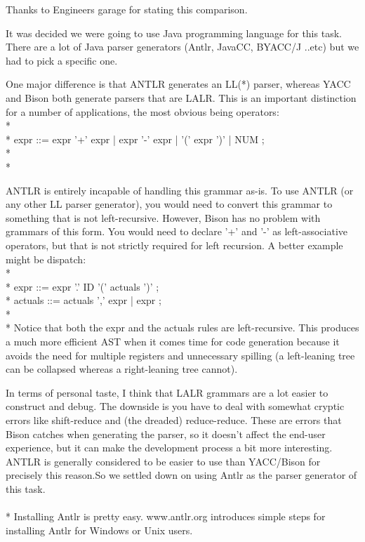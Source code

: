 \documentclass[a4paper]{article}
\begin{document}
Thanks to Engineers garage for stating this comparison.

\newpage
\bigskip
  \bigskip

It was decided we were going to use Java programming language for this task. There are a lot of Java parser generators (Antlr, JavaCC, BYACC/J ..etc) but we had to pick a specific one.

One major difference is that ANTLR generates an LL(*) parser, whereas YACC and Bison both generate parsers that are LALR. This is an important distinction for a number of applications, the most obvious being operators:
\\*
\\*
expr ::= expr '+' expr
       | expr '-' expr
       | '(' expr ')'
       | NUM ;
       \\*
\\*


ANTLR is entirely incapable of handling this grammar as-is. To use ANTLR (or any other LL parser generator), you would need to convert this grammar to something that is not left-recursive. However, Bison has no problem with grammars of this form. You would need to declare '+' and '-' as left-associative operators, but that is not strictly required for left recursion. A better example might be dispatch:
\\*
\\*
expr ::= expr '.' ID '(' actuals ')' ;
\\*
actuals ::= actuals ',' expr | expr ;
\\*
\\*
Notice that both the expr and the actuals rules are left-recursive. This produces a much more efficient AST when it comes time for code generation because it avoids the need for multiple registers and unnecessary spilling (a left-leaning tree can be collapsed whereas a right-leaning tree cannot).

In terms of personal taste, I think that LALR grammars are a lot easier to construct and debug. The downside is you have to deal with somewhat cryptic errors like shift-reduce and (the dreaded) reduce-reduce. These are errors that Bison catches when generating the parser, so it doesn't affect the end-user experience, but it can make the development process a bit more interesting. ANTLR is generally considered to be easier to use than YACC/Bison for precisely this reason.So we settled down on using Antlr as the parser generator of this task. \\
\\*
Installing Antlr is pretty easy. www.antlr.org introduces simple steps for installing Antlr for Windows or Unix users.
\end{document}
